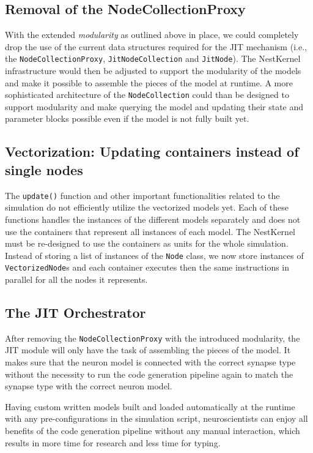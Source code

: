 \subsection*{Removal of the NodeCollectionProxy}

With the extended \emph{modularity} as outlined above in place, we could completely drop the use of the current data structures required for the JIT mechanism (i.e., the \texttt{NodeCollectionProxy}, \texttt{JitNodeCollection} and \texttt{JitNode}). The NestKernel infrastructure would then be adjusted to support the modularity of the models and make it possible to assemble the pieces of the model at runtime. A more sophisticated architecture of the \texttt{NodeCollection} could than be designed to support modularity and make querying the model and updating their state and parameter blocks possible even if the model is not fully built yet.

\subsection*{Vectorization: Updating containers instead of single nodes}

The \texttt{update()} function and other important functionalities related to the simulation do not efficiently utilize the vectorized models yet. Each of these functions handles the instances of the different models separately and does not use the containers that represent all instances of each model. The NestKernel must be re-designed to use the containers as units for the whole simulation. Instead of storing a list of instances of the \texttt{Node} class, we now store instances of \texttt{VectorizedNode}s and each container executes then the same instructions in parallel for all the nodes it represents.

\subsection*{The JIT Orchestrator}

After removing the \texttt{NodeCollectionProxy} with the introduced modularity, the JIT module will only have the task of assembling the pieces of the model. It makes sure that the neuron model is connected with the correct synapse type without the necessity to run the code generation pipeline again to match the synapse type with the correct neuron model.


Having custom written models built and loaded automatically at the runtime with any pre-configurations in the simulation script,  neuroscientists can enjoy all benefits of the code generation pipeline without any manual interaction, which results in more time for research and less time for typing.

\cleardoublepage
